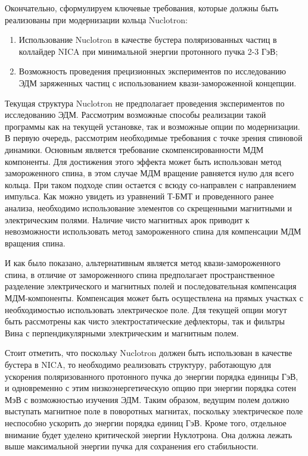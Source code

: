 Окончательно, сформулируем ключевые требования, которые должны быть реализованы при модернизации кольца Nuclotron:

\begin{enumerate}
    \item Использование Nuclotron в качестве бустера поляризованных частиц в коллайдер NICA при минимальной энергии протонного пучка 2-3 ГэВ;
    \item Возможность проведения прецизионных экспериментов по исследованию ЭДМ заряженных частиц с использованием квази-замороженной концепции.
\end{enumerate}

\par Текущая структура Nuclotron не предполагает проведения экспериментов по исследованию ЭДМ. Рассмотрим возможные способы реализации такой программы как на текущей установке, так и возможные опции по модернизации. В первую очередь, рассмотрим необходимые требования с точке зрения спиновой динамики. Основным является требование скомпенсированности МДМ компоненты. Для достижения этого эффекта может быть использован метод замороженного спина, в этом случае МДМ вращение равняется нулю для всего кольца. При таком подходе спин остается с всюду со-направлен с направлением импульса. Как можно увидеть из уравнений Т-БМТ и проведенного ранее анализа, необходимо использование элементов со скрещенными магнитными и электрическим полями. Наличие чисто магнитных арок приводит к невозможности использовать метод замороженного спина для компенсации МДМ вращения спина.

\par И как было показано, альтернативным является метод квази-замороженного спина, в отличие от замороженного спина предполагает пространственное разделение электрического и магнитных полей и последовательная компенсация МДМ-компоненты. Компенсация может быть осуществлена на прямых участках с необходимостью использовать электрическое поле. Для текущей опции могут быть рассмотрены как чисто электростатические дефлекторы, так и фильтры Вина с перпендикулярными электрическим и магнитным полем.

\par Стоит отметить, что поскольку Nuclotron должен быть использован в качестве бустера в NICA, то необходимо реализовать структуру, работающую для ускорения поляризованного протонного пучка до энергии порядка единицы ГэВ, и одновременно с этим низкоэнергетическую опцию при энергии порядка сотен МэВ с возможностью изучения ЭДМ. Таким образом, ведущим полем должно выступать магнитное поле в поворотных магнитах, поскольку электрическое поле неспособно ускорить до энергии порядка единиц ГэВ. Кроме того, отдельное внимание будет уделено критической энергии Нуклотрона. Она должна лежать выше максимальной энергии пучка для сохранения его стабильности.
	
